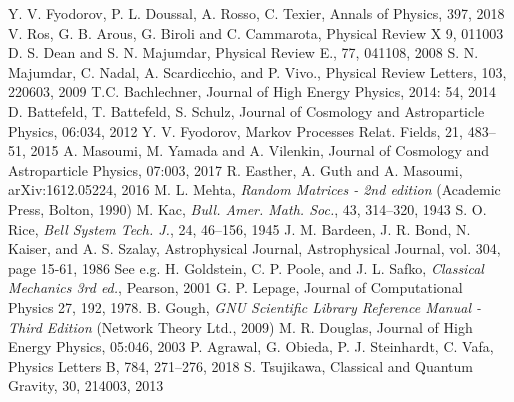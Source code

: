 \documentclass[12pt]{article}
\begin{document}
\begin{thebibliography}{99}
 Y. V. Fyodorov, P. L. Doussal, A. Rosso, C. Texier, Annals of Physics, 397, 2018
  V. Ros, G. B. Arous, G. Biroli and C. Cammarota, Physical Review X 9, 011003
 D. S. Dean and S. N. Majumdar, Physical Review E., 77, 041108, 2008
 S. N. Majumdar, C. Nadal, A. Scardicchio, and P. Vivo., Physical Review Letters, 103, 220603, 2009
 T.C. Bachlechner, Journal of High Energy Physics, 2014: 54, 2014
 D. Battefeld, T. Battefeld, S. Schulz, Journal of Cosmology and Astroparticle Physics, 06:034, 2012
 Y. V. Fyodorov, Markov Processes Relat. Fields, 21, 483--51, 2015
 A. Masoumi, M. Yamada and A. Vilenkin, Journal of Cosmology and Astroparticle Physics, 07:003, 2017
 R. Easther, A. Guth and A. Masoumi, arXiv:1612.05224, 2016
 M. L. Mehta, \emph{Random Matrices - 2nd edition} (Academic Press, Bolton, 1990)
 M. Kac, \emph{Bull. Amer. Math. Soc.}, 43, 314–320, 1943
  S. O. Rice, \emph{Bell System Tech. J.}, 24, 46--156, 1945
 J. M. Bardeen, J. R. Bond, N. Kaiser, and A. S. Szalay, Astrophysical Journal, Astrophysical Journal, vol. 304, page 15-61, 1986
 See e.g. H. Goldstein, C. P. Poole, and J. L. Safko, \emph{Classical Mechanics 3rd ed.}, Pearson, 2001
 G. P. Lepage, Journal of Computational Physics 27, 192, 1978.
 B. Gough, \emph{GNU Scientific Library Reference Manual - Third Edition} (Network Theory Ltd., 2009)
 M. R. Douglas, Journal of High Energy Physics, 05:046, 2003
 P. Agrawal, G. Obieda, P. J. Steinhardt, C. Vafa, Physics Letters B, 784, 271--276, 2018
 S. Tsujikawa, Classical and Quantum Gravity, 30, 214003, 2013
\end{thebibliography}
\end{document}
